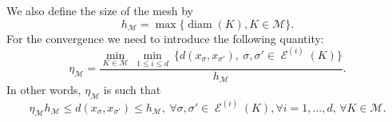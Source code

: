 \documentclass{amsart}
\numberwithin{equation}{section}
\begin{document}
\medskip
We also define the size of the mesh by 
 \[
 h_{{\mathcal M}}=\max\{\operatorname{diam}(K),  K\in{{\mathcal M}}\}.
\]
For the convergence we need to introduce the following quantity:
\begin{equation}
\eta_{{\mathcal M}}  =\frac{\displaystyle \min_{K \in {{\mathcal M}}}\ \min_{1 \le i \le d}
\ \{ d(x_{{\sigma}}, x_{{{\sigma}}'}), ~{{\sigma}},{{\sigma}}' \in \operatorname{{\mathcal{E}}}^{(i)}(K) \}}{h _{{\mathcal M}}}.
\label{regmesh} \end{equation}
In other words, $ \eta_{{\mathcal M}} $ is such that
\begin{equation*}
\eta_{{\mathcal M}} h_{{\mathcal M}} \le d(x_{{\sigma}}, x_{{{\sigma}}'}) \le h_{{\mathcal M}}, \ \forall {{\sigma}},{{\sigma}}' \in \operatorname{{\mathcal{E}}}^{(i)}(K), \forall  i=1,...,d, \, \forall K \in {{\mathcal M}}.
\end{equation*}
\end{document}
